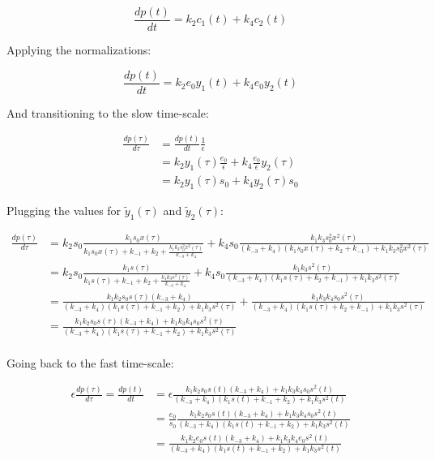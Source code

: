     $$\frac{dp(t)}{dt} = k_2c_1(t) + k_4c_2(t)$$

    Applying the normalizations:

    $$\frac{dp(t)}{dt} = k_2e_0y_1(t) + k_4e_0y_2(t)$$

    And transitioning to the slow time-scale:

    \begin{align*}
      \frac{dp(\tau)}{d\tau} &= \frac{dp(t)}{dt}\frac{1}{\epsilon}\\
                             &= k_2y_1(\tau)\frac{e_0}{\epsilon} + k_4\frac{e_0}{\epsilon}y_2(\tau)\\
                             &= k_2y_1(\tau)s_0 + k_4y_2(\tau)s_0
    \end{align*}

    Plugging the values for $\tilde{y}_1(\tau)$ and $\tilde{y}_2(\tau)$:

    \begin{align*}
      \frac{dp(\tau)}{d\tau} &= k_2s_0\frac{k_1s_0x(\tau)}{k_1s_0x(\tau) + k_{-1} + k_2+ \frac{k_1k_3s_0^2x^2(\tau)}{k_{-3} + k_4}} + k_4s_0\frac{k_1k_3s_0^2x^2(\tau)}{(k_{-3}+k_4)(k_1s_0x(\tau) + k_2 + k_{-1}) + k_1k_3s_0^2x^2(\tau)}\\
                             &= k_2s_0\frac{k_1s(\tau)}{k_1s(\tau) + k_{-1} + k_2+ \frac{k_1k_3s^2(\tau)}{k_{-3} + k_4}} + k_4s_0\frac{k_1k_3s^2(\tau)}{(k_{-3}+k_4)(k_1s(\tau) + k_2 + k_{-1}) + k_1k_3s^2(\tau)}\\
                             &= \frac{k_1k_2s_0s(\tau)(k_{-3}+k_4)}{(k_{-3}+k_4)(k_1s(\tau) + k_{-1} + k_2)+ k_1k_3s^2(\tau)} + \frac{k_1k_3k_4s_0s^2(\tau)}{(k_{-3}+k_4)(k_1s(\tau) + k_2 + k_{-1}) + k_1k_3s^2(\tau)}\\
                             &= \frac{k_1k_2s_0s(\tau)(k_{-3}+k_4) + k_1k_3k_4s_0s^2(\tau)}{(k_{-3}+k_4)(k_1s(\tau) + k_{-1} + k_2)+ k_1k_3s^2(\tau)}\\
    \end{align*}

    Going back to the fast time-scale:

    \begin{align*}
      \epsilon\frac{dp(\tau)}{d\tau} = \frac{dp(t)}{dt} &= \epsilon\frac{k_1k_2s_0s(t)(k_{-3}+k_4) + k_1k_3k_4s_0s^2(t)}{(k_{-3}+k_4)(k_1s(t) + k_{-1} + k_2)+ k_1k_3s^2(t)}\\
                                                        &= \frac{e_0}{s_0}\frac{k_1k_2s_0s(t)(k_{-3}+k_4) + k_1k_3k_4s_0s^2(t)}{(k_{-3}+k_4)(k_1s(t) + k_{-1} + k_2)+ k_1k_3s^2(t)}\\
                                                        &= \frac{k_1k_2e_0s(t)(k_{-3}+k_4) + k_1k_3k_4e_0s^2(t)}{(k_{-3}+k_4)(k_1s(t) + k_{-1} + k_2)+ k_1k_3s^2(t)}
    \end{align*}

